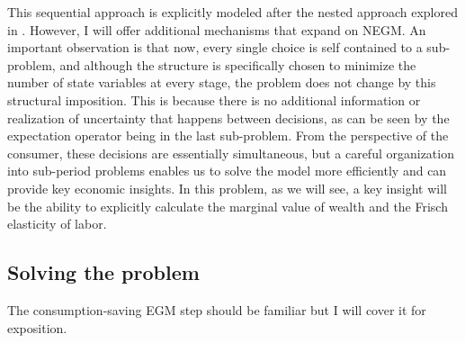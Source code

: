 \documentclass[\econtexRoot/SequentialEGM]{subfiles}
\begin{document}
This sequential approach is explicitly modeled after the nested approach explored in \cite{Druedahl2021-wl}. However, I will offer additional mechanisms that expand on NEGM. An important observation is that now, every single choice is self contained to a sub-problem, and although the structure is specifically chosen to minimize the number of state variables at every stage, the problem does not change by this structural imposition. This is because there is no additional information or realization of uncertainty that happens between decisions, as can be seen by the expectation operator being in the last sub-problem. From the perspective of the consumer, these decisions are essentially simultaneous, but a careful organization into sub-period problems enables us to solve the model more efficiently and can provide key economic insights. In this problem, as we will see, a key insight will be the ability to explicitly calculate the marginal value of wealth and the Frisch elasticity of labor.

%

\subsection{Solving the problem}

The consumption-saving EGM step should be familiar but I will cover it for exposition.
\end{document}
